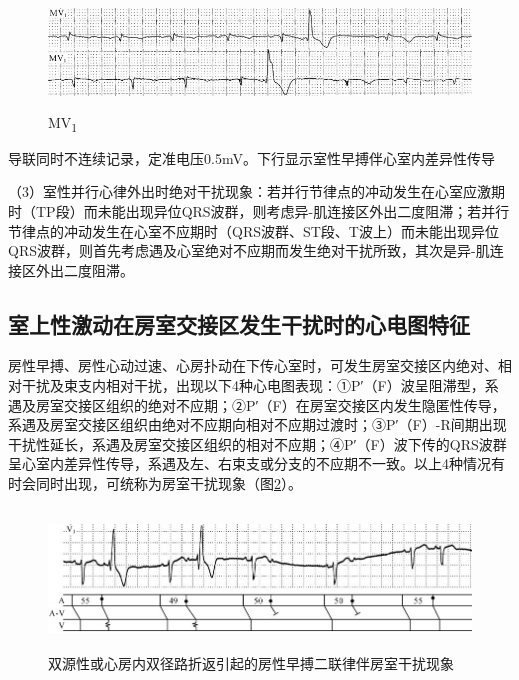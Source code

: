\begin{figure}[!htbp]
 \centering
 \includegraphics[width=5.58333in,height=1.16667in]{./images/Image00449.jpg}
 \captionsetup{justification=centering}
 \caption{MV\textsubscript{1}}
 \label{fig26-8}
  \end{figure} 
导联同时不连续记录，定准电压0.5mV。下行显示室性早搏伴心室内差异性传导

（3）室性并行心律外出时绝对干扰现象：若并行节律点的冲动发生在心室应激期时（TP段）而未能出现异位QRS波群，则考虑异-肌连接区外出二度阻滞；若并行节律点的冲动发生在心室不应期时（QRS波群、ST段、T波上）而未能出现异位QRS波群，则首先考虑遇及心室绝对不应期而发生绝对干扰所致，其次是异-肌连接区外出二度阻滞。

\protect\hypertarget{text00033.htmlux5cux23subid399}{}{}

\subsection{室上性激动在房室交接区发生干扰时的心电图特征}

房性早搏、房性心动过速、心房扑动在下传心室时，可发生房室交接区内绝对、相对干扰及束支内相对干扰，出现以下4种心电图表现：①P′（F）波呈阻滞型，系遇及房室交接区组织的绝对不应期；②P′（F）在房室交接区内发生隐匿性传导，系遇及房室交接区组织由绝对不应期向相对不应期过渡时；③P′（F）-R间期出现干扰性延长，系遇及房室交接区组织的相对不应期；④P′（F）波下传的QRS波群呈心室内差异性传导，系遇及左、右束支或分支的不应期不一致。以上4种情况有时会同时出现，可统称为房室干扰现象（图\ref{fig26-9}）。

\begin{figure}[!htbp]
 \centering
 \includegraphics[width=5.79167in,height=1.47917in]{./images/Image00450.jpg}
 \captionsetup{justification=centering}
 \caption{双源性或心房内双径路折返引起的房性早搏二联律伴房室干扰现象}
 \label{fig26-9}
  \end{figure} 

